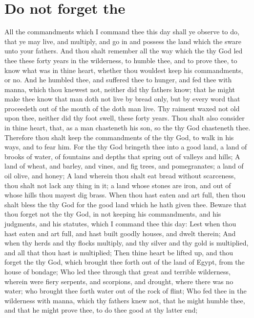 \section*{Do not forget the \LORD}
\begin{biblechapter} %
\verse All the commandments which I command thee this day shall ye observe to do, that ye may live, and multiply, and go in and possess the land which the \LORD sware unto your fathers.
\verse And thou shalt remember all the way which the \LORD thy God led thee these forty years in the wilderness, to humble thee, and to prove thee, to know what was in thine heart, whether thou wouldest keep his commandments, or no.
\verse And he humbled thee, and suffered thee to hunger, and fed thee with manna, which thou knewest not, neither did thy fathers know; that he might make thee know that man doth not live by bread only, but by every word that proceedeth out of the mouth of the \LORD doth man live.
\verse Thy raiment waxed not old upon thee, neither did thy foot swell, these forty years.
\verse Thou shalt also consider in thine heart, that, as a man chasteneth his son, so the \LORD thy God chasteneth thee.
\verse Therefore thou shalt keep the commandments of the \LORD thy God, to walk in his ways, and to fear him.
\verse For the \LORD thy God bringeth thee into a good land, a land of brooks of water, of fountains and depths that spring out of valleys and hills;
\verse A land of wheat, and barley, and vines, and fig trees, and pomegranates; a land of oil olive, and honey;
\verse A land wherein thou shalt eat bread without scarceness, thou shalt not lack any thing in it; a land whose stones are iron, and out of whose hills thou mayest dig brass.
\verse When thou hast eaten and art full, then thou shalt bless the \LORD thy God for the good land which he hath given thee.
\verse Beware that thou forget not the \LORD thy God, in not keeping his commandments, and his judgments, and his statutes, which I command thee this day:
\verse Lest when thou hast eaten and art full, and hast built goodly houses, and dwelt therein;
\verse And when thy herds and thy flocks multiply, and thy silver and thy gold is multiplied, and all that thou hast is multiplied;
\verse Then thine heart be lifted up, and thou forget the \LORD thy God, which brought thee forth out of the land of Egypt, from the house of bondage;
\verse Who led thee through that great and terrible wilderness, wherein were fiery serpents, and scorpions, and drought, where there was no water; who brought thee forth water out of the rock of flint;
\verse Who fed thee in the wilderness with manna, which thy fathers knew not, that he might humble thee, and that he might prove thee, to do thee good at thy latter end;

\end{biblechapter}
